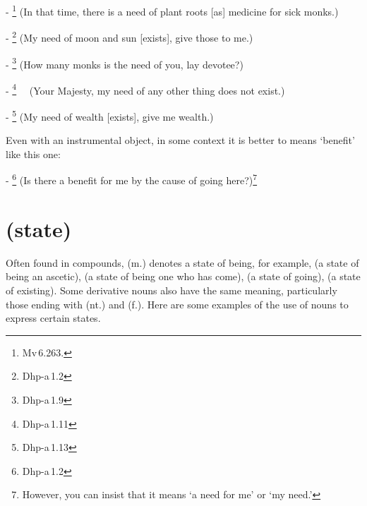 - \footnote{Mv\,6.263.} (In that time, there is a need of plant roots [as] medicine for sick monks.)\par
- \footnote{Dhp-a\,1.2} (My need of moon and sun [exists], give those to me.)\par
- \footnote{Dhp-a\,1.9} (How many monks is the need of you, lay devotee?)\par
- \footnote{Dhp-a\,1.11} \ \ (Your Majesty, my need of any other thing does not exist.)\par
- \footnote{Dhp-a\,1.13} (My need of wealth [exists], give me wealth.)\par

\medskip
Even with an instrumental object, in some context it is better to means `benefit' like this one:\par
- \footnote{Dhp-a\,1.2} (Is there a benefit for me by the cause of going here?)\footnote{However, you can insist that it means `a need for me' or `my need.'}\par

{}
\section*{ (state)}

Often found in compounds,  (m.) denotes a state of being, for example,  (a state of being an ascetic),  (a state of being one who has come),  (a state of going),  (a state of existing). Some derivative nouns also have the same meaning, particularly those ending with  (nt.) and  (f.). Here are some examples of the use of nouns to express certain states.

